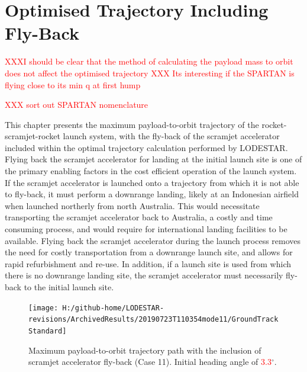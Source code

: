 
\cleardoublepage
\chapter{Optimised Trajectory Including Fly-Back}\label{chapter:Flyback}

\textcolor{red}{XXXI should be clear that the method of calculating the payload mass to orbit does not affect the optimised trajectory}
\textcolor{red}{ XXX Its interesting if the SPARTAN is flying close to its min q at first hump}

\textcolor{red}{XXX sort out SPARTAN nomenclature}
	
This chapter presents the maximum payload-to-orbit trajectory of the rocket-scramjet-rocket launch system, with the fly-back of the scramjet accelerator included within the optimal trajectory calculation performed by LODESTAR. 
Flying back the scramjet accelerator for landing at the initial launch site is one of the primary enabling factors in the cost efficient operation of the launch system. If the scramjet accelerator is launched onto a trajectory from which it is not able to fly-back, it must perform a downrange landing, likely at an Indonesian airfield when launched northerly from north Australia. This would necessitate transporting the scramjet accelerator back to Australia, a costly and time consuming process, and would require for international landing facilities to be available. 
Flying back the scramjet accelerator during the launch process removes the need for costly transportation from a downrange launch site, and allows for rapid refurbishment and re-use.
In addition, if a launch site is used from which there is no downrange landing site, the scramjet accelerator must necessarily fly-back to the initial launch site. 


\begin{figure}[ht]%
	\centering
	\texttt{[image: H:/github-home/LODESTAR-revisions/ArchivedResults/20190723T110354mode11/GroundTrackStandard]}
	\caption{Maximum payload-to-orbit trajectory path with the inclusion of scramjet accelerator fly-back (Case 11). Initial heading angle of \textcolor{red}{3.3}$^\circ$.} %
	\label{fig:GroundTrackStandard}
\end{figure}


